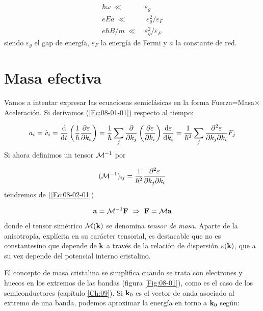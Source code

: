 \begin{equation}
	\begin{split}
	\hbar \omega \ \ll \ & \varepsilon_g \\
	e E a \ \ll & \ \varepsilon_g^2 / \varepsilon_F \\
	e\hbar B/m \ \ll \ & \varepsilon_g^2 / \varepsilon_F
	\end{split}
\end{equation}
siendo $\varepsilon_g$ el gap de energía, $\varepsilon_F$ la energía de Fermi y $a$ la constante de red.

\section{Masa efectiva}

Vamos a intentar expresar las ecuacioens semiclásicas en la forma Fuerza=Masa$\times$Aceleración. Si derivamos (\ref{Ec:08-01-01}) respecto al tiempo:

\begin{equation}
	a_i = \dot{v}_i  = \frac{\mathrm{d} }{\mathrm{d} t} \left( \frac{1}{\hbar} \frac{\partial \varepsilon}{\partial k_i} \right) = \frac{1}{\hbar} \sum_j \frac{\partial }{\partial k_j} \left( \frac{\partial \varepsilon}{\partial k_i} \right) \frac{\mathrm{d} \varepsilon}{\mathrm{d} k_i} = \frac{1}{\hbar^2} \sum_j \frac{\partial ^2 \varepsilon}{\partial k_j \partial k_i} F_j \label{Ec:08-02-01}
\end{equation}
Si ahora definimos un tensor $\mathcal{M}^{-1}$ por 

\begin{equation}
	(\mathcal{M}^{-1})_{ij} = \frac{1}{\hbar^2} \frac{\partial ^2 \varepsilon}{\partial k_j \partial k_i}
\end{equation}
tendremos de (\ref{Ec:08-02-01}) 

\begin{equation}
	\mathbf{a} = \mathcal{M}^{-1} \mathbf{F} \ \Rightarrow \ \mathbf{F} = \mathcal{M} \mathbf{a}
\end{equation}
donde el tensor simétrico $\mathcal{M} (\mathbf{k})$ se denomina \textit{tensor de masa}. Aparte de la anisotropía, explícita en su carácter tensorial, es destacable que no es constantesino que depende de $\mathbf{k}$ a través de la relación de dispersión $\varepsilon(\mathbf{k})$, que a su vez depende del potencial interno cristalino.

El concepto de masa cristalina se simplifica cuando se trata con electrones y huecos en los extremos de las bandas (figura \ref{Fig:08-01}), como es el caso de los semiconductores (capítulo \ref{Ch:09}). Si $\mathbf{k}_0$ es el vector de onda asociado al extremo de una banda, podemos aproximar la energía en torno a $\mathbf{k}_0$ según:

